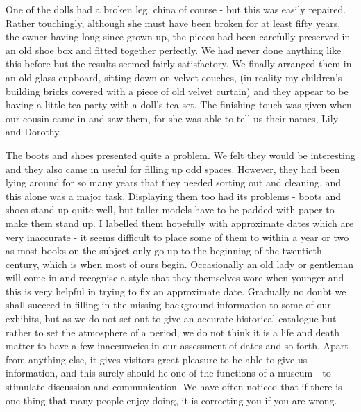 One of the dolls had a broken leg, china of course - but this was easily repaired. Rather touchingly, although she must have been broken for at least fifty years, the owner having long since grown up, the pieces had been carefully preserved in an old shoe box and fitted together perfectly. We had never done anything like this before but the results seemed fairly satisfactory. We finally arranged them in an old glass cupboard, sitting down on velvet couches, (in reality my children's building bricks covered with a piece of old velvet curtain) and they appear to be having a little tea party with a doll's tea set. The finishing touch was given when our cousin came in and saw them, for she was able to tell us their names, Lily and Dorothy. 

The boots and shoes presented quite a problem. We felt they would be interesting and they also came in useful for filling up odd spaces. However, they had been lying around for so many years that they needed sorting out and cleaning, and this alone was a major task. Displaying them too had its problems - boots and shoes stand up quite well, but taller models have to be padded with paper to make them stand up. I labelled them hopefully with approximate dates which are very inaccurate - it seems difficult to place some of them to within a year or two as most books on the subject only go up to the beginning of the twentieth century, which is when most of ours begin. Occasionally an old lady or gentleman will come in and recognise a style that they themselves wore when younger and this is very helpful in trying to fix an approximate date. Gradually no doubt we shall succeed in filling in the missing background information to some of our exhibits, but as we do not set out to give an accurate historical catalogue but rather to set the atmosphere of a period, we do not think it is a life and death matter to have a few inaccuracies in our assessment of dates and so forth. Apart from anything else, it gives visitors great pleasure to be able to give us information, and this surely should he one of the functions of a museum - to stimulate discussion and communication. We have often noticed that if there is one thing that many people enjoy doing, it is correcting you if you are wrong.

